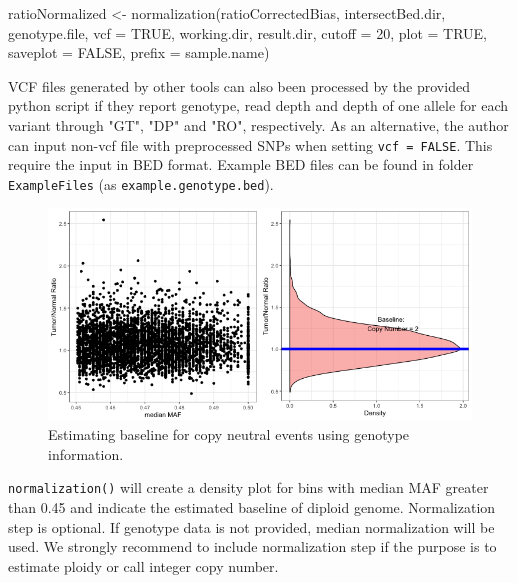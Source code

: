 \documentclass{article}
\newcommand{\code}[1]{\texttt{#1}}
\begin{document}
\begin{Schunk}
\begin{Sinput}
 ratioNormalized <- normalization(ratioCorrectedBias,
                                  intersectBed.dir,
                                  genotype.file,
                                  vcf = TRUE,
                                  working.dir,
                                  result.dir,
                                  cutoff = 20,
                                  plot = TRUE,
                                  saveplot = FALSE,
                                  prefix = sample.name)
\end{Sinput}
\end{Schunk}

VCF files generated by other tools can also been processed by the provided python script if they report genotype, read depth and depth of one allele for each variant through "GT", "DP" and "RO", respectively. As an alternative, the author can input non-vcf file with preprocessed SNPs when setting \code{vcf = FALSE}. This require the input in BED format. Example BED files can be found in folder \code{ExampleFiles} (as \code{example.genotype.bed}).

\begin{figure}
\begin{center}
\includegraphics[width=\textwidth]{figure/normalization-1}
\end{center}
\caption{Estimating baseline for copy neutral events using genotype information.}
\label{normalization}
\end{figure}


\code{normalization()} will create a density plot for bins with median MAF greater than 0.45 and indicate the estimated baseline of diploid genome. Normalization step is optional. If genotype data is not provided, median normalization will be used. We strongly recommend to include normalization step if the purpose is to estimate ploidy or call integer copy number.
\end{document}
